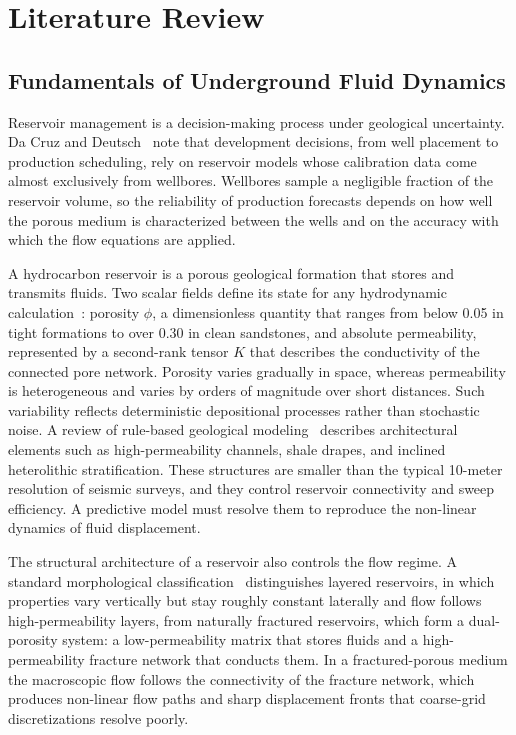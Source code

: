 \chapter{Literature Review}
\label{chap:lr}
\section{Fundamentals of Underground Fluid Dynamics}
\label{sec:theoretical_foundations}

Reservoir management is a decision-making process under geological uncertainty. Da Cruz and Deutsch~\cite{pangea_uncertainty} note that development decisions, from well placement to production scheduling, rely on reservoir models whose calibration data come almost exclusively from wellbores. Wellbores sample a negligible fraction of the reservoir volume, so the reliability of production forecasts depends on how well the porous medium is characterized between the wells and on the accuracy with which the flow equations are applied.

A hydrocarbon reservoir is a porous geological formation that stores and transmits fluids. Two scalar fields define its state for any hydrodynamic calculation~\cite{ssdynamics_guide}: porosity $\phi$, a dimensionless quantity that ranges from below 0.05 in tight formations to over 0.30 in clean sandstones, and absolute permeability, represented by a second-rank tensor $K$ that describes the conductivity of the connected pore network. Porosity varies gradually in space, whereas permeability is heterogeneous and varies by orders of magnitude over short distances. Such variability reflects deterministic depositional processes rather than stochastic noise. A review of rule-based geological modeling~\cite{subsurfaceai_heterogeneity} describes architectural elements such as high-permeability channels, shale drapes, and inclined heterolithic stratification. These structures are smaller than the typical 10-meter resolution of seismic surveys, and they control reservoir connectivity and sweep efficiency. A predictive model must resolve them to reproduce the non-linear dynamics of fluid displacement.

The structural architecture of a reservoir also controls the flow regime. A standard morphological classification~\cite{studfile_types} distinguishes layered reservoirs, in which properties vary vertically but stay roughly constant laterally and flow follows high-permeability layers, from naturally fractured reservoirs, which form a dual-porosity system: a low-permeability matrix that stores fluids and a high-permeability fracture network that conducts them. In a fractured-porous medium the macroscopic flow follows the connectivity of the fracture network, which produces non-linear flow paths and sharp displacement fronts that coarse-grid discretizations resolve poorly.

